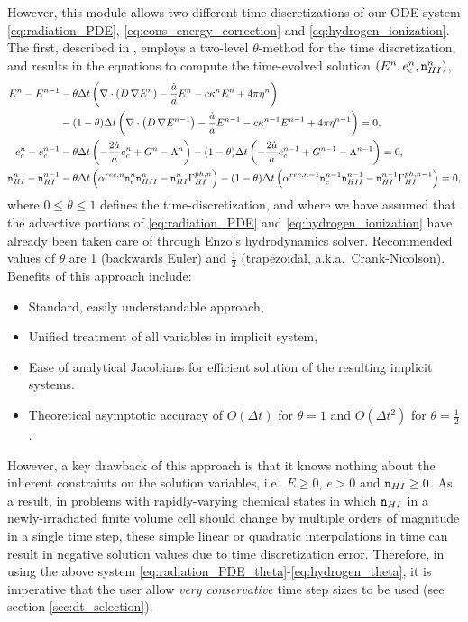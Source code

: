 \documentclass[letterpaper,10pt]{article}
\renewcommand{\(}{\left(}
\renewcommand{\)}{\right)}
\newcommand{\dt}{\Delta t}
\newcommand{\mn}{{\tt n}}
\begin{document}
However, this module allows two different time discretizations of our
ODE system \eqref{eq:radiation_PDE}, \eqref{eq:cons_energy_correction}
and \eqref{eq:hydrogen_ionization}.  The first, described in
\cite{ReynoldsHayesPaschosNorman2009}, employs a two-level
$\theta$-method for the time discretization, and results in the
equations to compute the time-evolved solution $(E^n,e_c^n,\mn_{HI}^n)$,
\begin{align}
  \label{eq:radiation_PDE_theta}
  E^n - E^{n-1} &- \theta\dt\left(\nabla\cdot\(D\,\nabla E^n\) - \frac{\dot{a}}{a} E^n -
    c\kappa^n E^n + 4\pi\eta^n\right) \\ 
  \notag
  & - (1-\theta)\dt\left(\nabla\cdot\(D\,\nabla E^{n-1}\) - \frac{\dot{a}}{a} E^{n-1} -
    c\kappa^{n-1} E^{n-1} + 4\pi\eta^{n-1}\right) = 0, \\ 
  \label{eq:energy_correction_theta}
  e_c^n - e_c^{n-1} &- \theta\dt\left(-\frac{2\dot{a}}{a}e_c^{n} + G^{n} -
    \Lambda^{n}\right) - (1-\theta)\dt\left(-\frac{2\dot{a}}{a}e_c^{n-1} + G^{n-1} -
    \Lambda^{n-1}\right) = 0, \\
  \label{eq:hydrogen_theta}
  \mn_{HI}^n - \mn_{HI}^{n-1} &-
    \theta\dt\left(\alpha^{rec,n} \mn_e^{n} \mn_{HII}^{n} -
      \mn_{HI}^{n} \Gamma_{HI}^{ph,n}\right) -
    (1-\theta)\dt\left(\alpha^{rec,n-1} \mn_e^{n-1} \mn_{HII}^{n-1} -
      \mn_{HI}^{n-1} \Gamma_{HI}^{ph,n-1}\right) = 0,
\end{align}
where $0\le\theta\le 1$ defines the time-discretization, and where we
have assumed that the advective portions of \eqref{eq:radiation_PDE}
and \eqref{eq:hydrogen_ionization} have already been taken care of
through Enzo's hydrodynamics solver.  Recommended values of $\theta$
are 1 (backwards Euler) and $\frac12$ (trapezoidal,
a.k.a.~Crank-Nicolson).  Benefits of this approach include:
\begin{itemize}
\item Standard, easily understandable approach,
\item Unified treatment of all variables in implicit system,
\item Ease of analytical Jacobians for efficient solution of the
  resulting implicit systems.
\item Theoretical asymptotic accuracy of $O(\dt)$ for $\theta=1$ and
  $O(\dt^2)$ for $\theta=\frac12$. 
\end{itemize}
However, a key drawback of this approach is that it knows nothing
about the inherent constraints on the solution variables, i.e.~$E\ge
0$, $e>0$ and $\mn_{HI}\ge 0$.  As a result, in problems with
rapidly-varying chemical states in which $\mn_{HI}$ in a
newly-irradiated finite volume cell should change by multiple orders 
of magnitude in a single time step, these simple linear or quadratic
interpolations in time can result in negative solution values due to
time discretization error.  Therefore, in using the above system 
\eqref{eq:radiation_PDE_theta}-\eqref{eq:hydrogen_theta}, it is
imperative that the user allow {\em very conservative} time step sizes
to be used (see section \ref{sec:dt_selection}).
\end{document}
